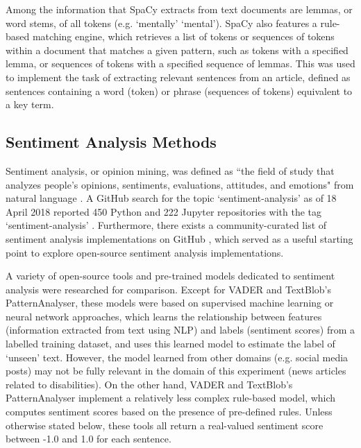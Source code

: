 \documentclass{report}
\begin{document}
Among the information that SpaCy extracts from text documents are lemmas, or word stems, of all tokens (e.g. `mentally' \textrightarrow\space `mental').
SpaCy also features a rule-based matching engine, which retrieves a list of tokens or sequences of tokens within a document that matches a given pattern, such as tokens with a specified lemma, or sequences of tokens with a specified sequence of lemmas.
This was used to implement the task of extracting relevant sentences from an article, defined as sentences containing a word (token) or phrase (sequences of tokens) equivalent to a key term.

\subsection{Sentiment Analysis Methods} \label{tc-sentiment}
Sentiment analysis, or opinion mining, was defined as ``the field of study that analyzes people's opinions, sentiments, evaluations, attitudes, and emotions" from natural language \cite{liu2012sentiment}.
A GitHub search for the topic `sentiment-analysis' as of 18 April 2018 reported 450 Python and 222 Jupyter repositories with the tag `sentiment-analysis' \cite{GitHub-sentiment-analysis}.
Furthermore, there exists a community-curated list of sentiment analysis implementations on GitHub \cite{awesome-sentiment-analysis}, which served as a useful starting point to explore open-source sentiment analysis implementations.

A variety of open-source tools and pre-trained models dedicated to sentiment analysis were researched for comparison.
Except for VADER and TextBlob's PatternAnalyser, these models were based on supervised machine learning or neural network approaches, which learns the relationship between features (information extracted from text using NLP) and labels (sentiment scores) from a labelled training dataset, and uses this learned model to estimate the label of `unseen' text.
However, the model learned from other domains (e.g. social media posts) may not be fully relevant in the domain of this experiment (news articles related to disabilities).
On the other hand, VADER and TextBlob's PatternAnalyser implement a relatively less complex rule-based model, which computes sentiment scores based on the presence of pre-defined rules.
Unless otherwise stated below, these tools all return a real-valued sentiment score between -1.0 and 1.0 for each sentence.
\end{document}
